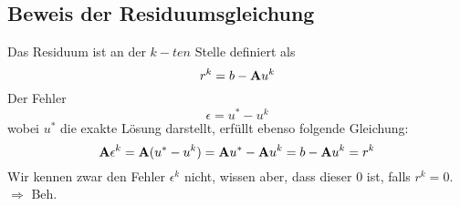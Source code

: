 \subsection{Beweis der Residuumsgleichung}

Das Residuum ist an der $k-ten$ Stelle definiert als 
\begin{equation}
r^{k} = b - {\textbf{A}}u^{k}
\end{equation}
Der Fehler
\begin{equation}
\epsilon = u^{*} - u^{k}\label{eq.Fehler}
\end{equation}
wobei $u^{*}$ die exakte Lösung darstellt, erfüllt ebenso folgende Gleichung:
\begin{equation}
{\textbf{A}}\epsilon^{k} = {\textbf{A}}(u^{*} - u^{k}) = {\textbf{A}} u^{*} - {\textbf{A}} u^{k} = b - {\textbf{A}} u^{k} = r^{k}
\end{equation}
Wir kennen zwar den Fehler $\epsilon^{k}$ nicht, wissen aber, dass dieser $0$ ist, falls $r^{k} = 0$.
$\Longrightarrow$ Beh.

